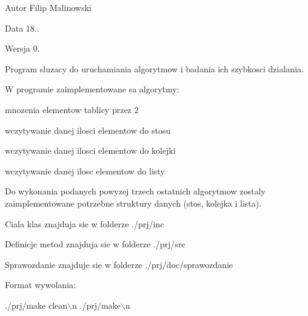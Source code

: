 \begin{DoxyAuthor}{Autor}
Filip Malinowski 
\end{DoxyAuthor}
\begin{DoxyDate}{Data}
18.. 
\end{DoxyDate}
\begin{DoxyVersion}{Wersja}
0.
\end{DoxyVersion}
Program sluzacy do uruchamiania algorytmow i badania ich szybkosci dzialania.\par
W programie zaimplementowane sa algorytmy\-:\par

\begin{DoxyItemize}
\item mnozenia elementow tablicy przez 2\par

\item wczytywanie danej ilosci elementow do stosu\par

\item wczytywanie danej ilosci elementow do kolejki\par

\item wczytywanie danej ilosc elementow do listy
\end{DoxyItemize}

Do wykonania podanych powyzej trzech ostatnich algorytmow zostaly zaimplementowane potrzebne struktury danych (stos, kolejka i lista).\par
\par
Ciala klas znajduja sie w folderze ./prj/inc\par
Definicje metod znajduja sie w folderze ./prj/src\par
Sprawozdanie znajduje sie w folderze ./prj/doc/sprawozdanie\par
\par
Format wywolania\-:\par

\begin{DoxyCode}
./prj/make clean\(\backslash\)n
./prj/make\(\backslash\)n
\end{DoxyCode}
 